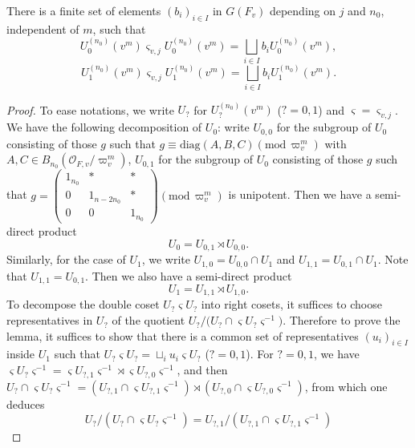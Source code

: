\documentclass[10pt,a4paper]{amsart}
\begin{document}
	\begin{proposition}
		There is a finite set of elements
		$(b_i)_{i\in I}$ in $G(F_v)$
		depending on $j$ and $n_0$,
		independent of $m$,
		such that
		\[
		U_0^{(n_0)}(v^m)
		\varsigma_{v,j}
		U_0^{(n_0)}(v^m)
		=
		\bigsqcup_{i\in I}
		b_i
		U_0^{(n_0)}(v^m),
		\]
		\[
		U_1^{(n_0)}(v^m)
		\varsigma_{v,j}
		U_1^{(n_0)}(v^m)
		=
		\bigsqcup_{i\in I}
		b_i
		U_1^{(n_0)}(v^m).
		\]
	\end{proposition}

	\begin{proof}
		To ease notations,
		we write
		$U_?$
		for $U_?^{(n_0)}(v^m)$
		($?=0,1$)
		and
		$\varsigma=\varsigma_{v,j}$.
		We have the following decomposition of
		$U_0$:
		write
		$U_{0,0}$
		for the subgroup of
		$U_0$
		consisting of those $g$ such that
		$g
		\equiv
		\mathrm{diag}
		(A,B,C)(\mathrm{mod}\,\varpi_v^m)$
		with $A,C\in
		B_{n_0}
		(\mathcal{O}_{F,v}/\varpi_v^m)$,
		$U_{0,1}$
		for the subgroup of
		$U_0$
		consisting of those 
		$g$ such that
		$g
		=
		\begin{pmatrix}
			1_{n_0} & \ast & \ast \\
			0 & 1_{n-2n_0} & \ast \\
			0 & 0 & 1_{n_0}
		\end{pmatrix}
		(\mathrm{mod}\,\varpi_v^m)$
		is unipotent.
		Then we have
		a semi-direct product
		\[
		U_0
		=
		U_{0,1}\rtimes U_{0,0}.
		\]
		Similarly, for the case of
		$U_1$,
		we write
		$U_{1,0}
		=
		U_{0,0}\cap
		U_1$
		and
		$U_{1,1}
		=
		U_{0,1}\cap
		U_1$.
		Note that $U_{1,1}=U_{0,1}$.
		Then we also have a semi-direct product
		\[
		U_1
		=
		U_{1,1}\rtimes U_{1,0}.
		\]
		To decompose the double coset
		$U_?
		\varsigma
		U_?$
		into right cosets,
		it suffices to choose representatives in
		$U_?$
		of the quotient
		$U_?/
		\big(
		U_?
		\cap
		\varsigma
		U_?\varsigma^{-1}
		\big)$.
		Therefore to prove the lemma,
		it suffices to show that
		there is a common set of representatives
		$(u_i)_{i\in I}$ inside
		$U_1$
		such that
		$U_?\varsigma U_?=
		\sqcup_iu_i\varsigma U_?$
		($?=0,1$).
		For $?=0,1$,
		we have
		$\varsigma
		U_?
		\varsigma^{-1}
		=
		\varsigma U_{?,1}\varsigma^{-1}
		\rtimes
		\varsigma U_{?,0}\varsigma^{-1}$,
		and then
		$U_?\cap
		\varsigma U_?\varsigma^{-1}
		=
		(
		U_{?,1}\cap
		\varsigma
		U_{?,1}\varsigma^{-1}
		)
		\rtimes
		(
		U_{?,0}\cap
		\varsigma
		U_{?,0}
		\varsigma^{-1}
		)$,
		from which one deduces
		\[
		U_?/
		(U_?\cap
		\varsigma U_?\varsigma^{-1})
		=
		U_{?,1}/
		(U_{?,1}\cap
		\varsigma
		U_{?,1}\varsigma^{-1})
\]
\end{proof}
\end{document}
